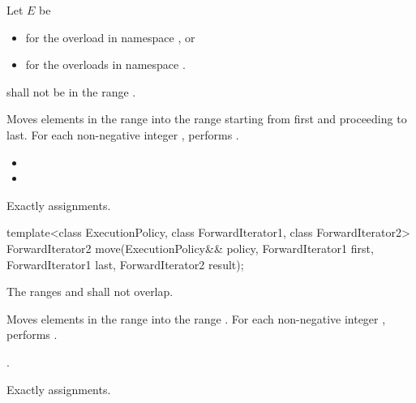 \begin{itemdescr}
\begin{addedblock}
\pnum
Let $E$ be
\begin{itemize}
\item {} for the overload in namespace , or
\item {} for the overloads in namespace .
\end{itemize}
\end{addedblock}

\pnum
\requires
{}
shall not be in the range
.

\pnum
\effects
Moves elements in the range 
into the range 
starting from first and proceeding to last.
For each non-negative integer
 ,
performs
.

\pnum
\returns
\begin{itemize}
\item {} 
\item {}
\end{itemize}

\pnum
\complexity
Exactly
 assignments.
\end{itemdescr}

%
\begin{itemdecl}
template<class ExecutionPolicy, class ForwardIterator1, class ForwardIterator2>
  ForwardIterator2 move(ExecutionPolicy&& policy,
                        ForwardIterator1 first, ForwardIterator1 last,
                        ForwardIterator2 result);
\end{itemdecl}

\begin{itemdescr}
\pnum
\requires The ranges  and
 shall not overlap.

\pnum
\effects Moves elements in the range  into
the range .
For each non-negative integer ,
performs .

\pnum
\returns {}.

\pnum
\complexity Exactly  assignments.
\end{itemdescr}

